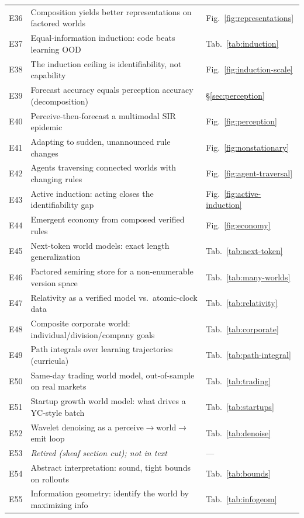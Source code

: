 \documentclass[11pt]{article}
\begin{document}
\begin{longtable}{@{}r p{} l@{}}
E36 & Composition yields better representations on factored worlds & Fig.~\ref{fig:representations} \\
E37 & Equal-information induction: code beats learning OOD & Tab.~\ref{tab:induction} \\
E38 & The induction ceiling is identifiability, not capability & Fig.~\ref{fig:induction-scale} \\
E39 & Forecast accuracy equals perception accuracy (decomposition) & \S\ref{sec:perception} \\
E40 & Perceive-then-forecast a multimodal SIR epidemic & Fig.~\ref{fig:perception} \\
E41 & Adapting to sudden, unannounced rule changes & Fig.~\ref{fig:nonstationary} \\
E42 & Agents traversing connected worlds with changing rules & Fig.~\ref{fig:agent-traversal} \\
E43 & Active induction: acting closes the identifiability gap & Fig.~\ref{fig:active-induction} \\
E44 & Emergent economy from composed verified rules & Fig.~\ref{fig:economy} \\
E45 & Next-token world models: exact length generalization & Tab.~\ref{tab:next-token} \\
E46 & Factored semiring store for a non-enumerable version space & Tab.~\ref{tab:many-worlds} \\
E47 & Relativity as a verified model vs.\ atomic-clock data & Tab.~\ref{tab:relativity} \\
E48 & Composite corporate world: individual/division/company goals & Tab.~\ref{tab:corporate} \\
E49 & Path integrals over learning trajectories (curricula) & Tab.~\ref{tab:path-integral} \\
E50 & Same-day trading world model, out-of-sample on real markets & Tab.~\ref{tab:trading} \\
E51 & Startup growth world model: what drives a YC-style batch & Tab.~\ref{tab:startups} \\
E52 & Wavelet denoising as a perceive$\to$world$\to$emit loop & Tab.~\ref{tab:denoise} \\
E53 & \emph{Retired (sheaf section cut); not in text} & --- \\
E54 & Abstract interpretation: sound, tight bounds on rollouts & Tab.~\ref{tab:bounds} \\
E55 & Information geometry: identify the world by maximizing info & Tab.~\ref{tab:infogeom} \\

\end{longtable}
\end{document}
